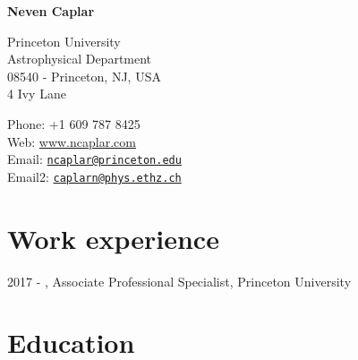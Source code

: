 \documentclass[11pt,letterpaper]{article}
\def\name{\textbf{Neven Caplar}}
\renewenvironment{itemize}{
  \begin{list}{}{
    \setlength{\leftmargin}{1.5em}
    \setlength{\itemsep}{0.10em}
    \setlength{\parskip}{0pt}
    \setlength{\parsep}{0.10em}
  }
}{
  \end{list}
}
\begin{document}
{\huge \name}


\bigskip

\begin{minipage}[t]{0.495\textwidth}
  Princeton University\\
  Astrophysical Department \\
  08540 - Princeton, NJ, USA	 \\
	4 Ivy Lane
\end{minipage}
\begin{minipage}[t]{0.495\textwidth}
  Phone: +1 609 787 8425 \\
  Web: \href{ www.ncaplar.com}{www.ncaplar.com} \\
  Email: \href{ncaplar@princeton.edu}{\nolinkurl{ncaplar@princeton.edu}} \\
  Email2: \href{caplarn@phys.ethz.ch}{\nolinkurl{caplarn@phys.ethz.ch}} \\

\end{minipage}


\section*{Work experience}

\begin{itemize}
  \item 2017 - , Associate Professional Specialist, Princeton University
\end{itemize}  


\section*{Education}
\end{document}
